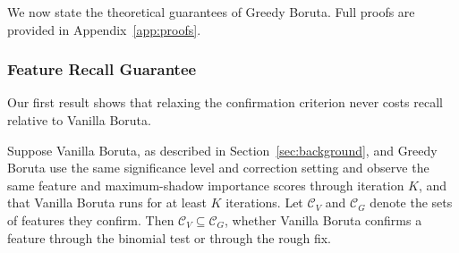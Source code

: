\documentclass[runningheads]{llncs}
\begin{document}
We now state the theoretical guarantees of Greedy Boruta. Full proofs are provided in Appendix~\ref{app:proofs}.

\subsubsection{Feature Recall Guarantee}

Our first result shows that relaxing the confirmation criterion never costs recall relative to Vanilla Boruta.

\begin{theorem}
\label{thm:recall}
Suppose Vanilla Boruta, as described in Section~\ref{sec:background}, and Greedy Boruta use the same significance level and correction setting and observe the same feature and maximum-shadow importance scores through iteration $K$, and that Vanilla Boruta runs for at least $K$ iterations. Let $\mathcal{C}_V$ and $\mathcal{C}_G$ denote the sets of features they confirm. Then $\mathcal{C}_V \subseteq \mathcal{C}_G$, whether Vanilla Boruta confirms a feature through the binomial test or through the rough fix.
\end{theorem}
\end{document}
